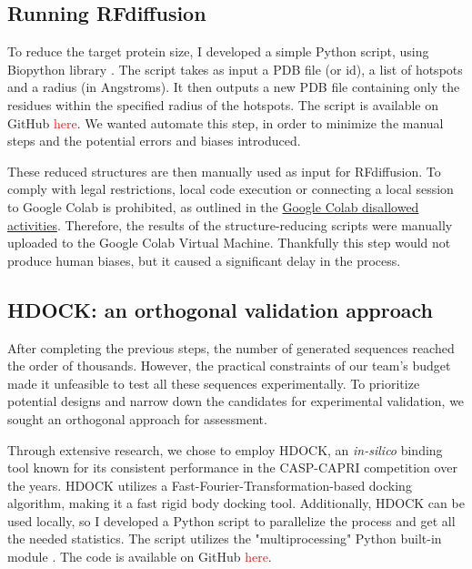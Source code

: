 \documentclass[11pt,a4paper]{article}
\begin{document}
\subsection{Running RFdiffusion}

To reduce the target protein size, I developed a simple Python script, using Biopython library \cite{biopython}. The script takes as input a PDB file (or id), a list of hotspots and a radius (in Angstroms). It then outputs a new PDB file containing only the residues within the specified radius of the hotspots. The script is available on GitHub \textcolor{red}{here}. We wanted automate this step, in order to minimize the manual steps and the potential errors and biases introduced.

These reduced structures are then manually used as input for RFdiffusion. To comply with legal restrictions, local code execution or connecting a local session to Google Colab is prohibited, as outlined in the \href{https://research.google.com/colaboratory/faq.html#disallowed-activities}{Google Colab disallowed activities}. Therefore, the results of the structure-reducing scripts were manually uploaded to the Google Colab Virtual Machine. Thankfully this step would not produce human biases, but it caused a significant delay in the process.

\subsection{HDOCK: an orthogonal validation approach}

After completing the previous steps, the number of generated sequences reached the order of thousands. However, the practical constraints of our team's budget made it unfeasible to test all these sequences experimentally. To prioritize potential designs and narrow down the candidates for experimental validation, we sought an orthogonal approach for assessment.

Through extensive research, we chose to employ HDOCK, an \emph{in-silico} binding tool \cite{yan2017hdock} known for its consistent performance in the CASP-CAPRI \cite{casp-capri} competition over the years. HDOCK utilizes a Fast-Fourier-Transformation-based docking algorithm, making it a fast rigid body docking tool. Additionally, HDOCK can be used locally, so I developed a Python script to parallelize the process and get all the needed statistics. The script utilizes the "multiprocessing" Python built-in module \cite{python_multiprocessing}. The code is available on GitHub \textcolor{red}{here}.
\end{document}
